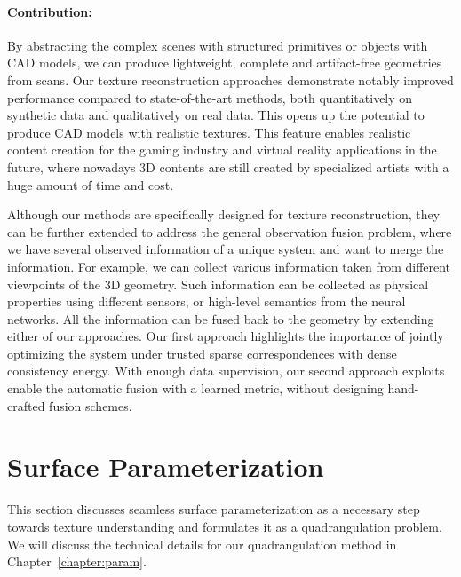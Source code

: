 \paragraph*{Contribution:} By abstracting the complex scenes with structured primitives or objects with CAD models, we can produce lightweight, complete and artifact-free geometries from scans. Our texture reconstruction approaches demonstrate notably improved performance compared to state-of-the-art methods, both quantitatively on synthetic data and qualitatively on real data. This opens up the potential to produce CAD models with realistic textures. This feature enables realistic content creation for the gaming industry and virtual reality applications in the future, where nowadays 3D contents are still created by specialized artists with a huge amount of time and cost.

Although our methods are specifically designed for texture reconstruction, they can be further extended to address the general observation fusion problem, where we have several observed information of a unique system and want to merge the information. For example, we can collect various information taken from different viewpoints of the 3D geometry. Such information can be collected as physical properties using different sensors, or high-level semantics from the neural networks. All the information can be fused back to the geometry by extending either of our approaches. Our first approach highlights the importance of jointly optimizing the system under trusted sparse correspondences with dense consistency energy. With enough data supervision, our second approach exploits enable the automatic fusion with a learned metric, without designing hand-crafted fusion schemes.

\section{Surface Parameterization}
\label{intro:param}
This section discusses seamless surface parameterization as a necessary step towards texture understanding and formulates it as a quadrangulation problem. We will discuss the technical details for our quadrangulation method in Chapter~\ref{chapter:param}.

